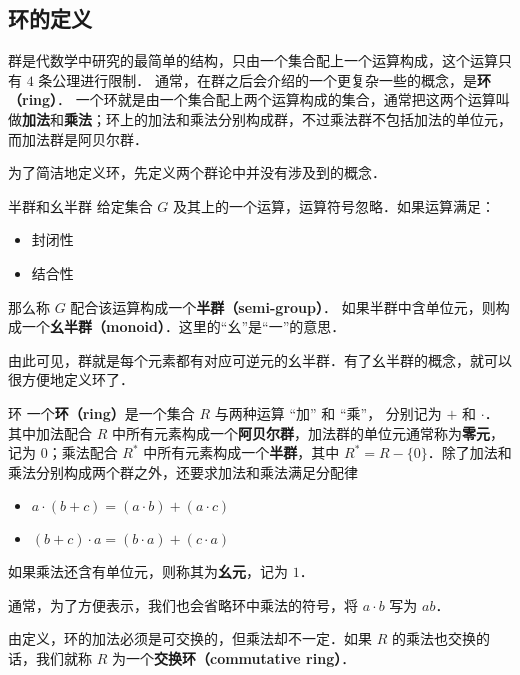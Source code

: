 


\subsection{环的定义}
群是代数学中研究的最简单的结构，只由一个集合配上一个运算构成，这个运算只有 $4$ 条公理进行限制． 通常，在群之后会介绍的一个更复杂一些的概念，是\textbf{环（ring）}． 一个环就是由一个集合配上两个运算构成的集合，通常把这两个运算叫做\textbf{加法}和\textbf{乘法}；环上的加法和乘法分别构成群，不过乘法群不包括加法的单位元，而加法群是阿贝尔群．

为了简洁地定义环，先定义两个群论中并没有涉及到的概念．

\begin{definition}{半群和幺半群}
给定集合 $G$ 及其上的一个运算，运算符号忽略．如果运算满足：
\begin{itemize}
\item 封闭性
\item 结合性
\end{itemize}
那么称 $G$ 配合该运算构成一个\textbf{半群（semi-group）}．
如果半群中含单位元，则构成一个\textbf{幺半群（monoid）}．这里的“幺”是“一”的意思．
\end{definition}

由此可见，群就是每个元素都有对应可逆元的幺半群．有了幺半群的概念，就可以很方便地定义环了．

\begin{definition}{环}
一个\textbf{环（ring）}是一个集合 $R$ 与两种运算 “加” 和 “乘”， 分别记为 $+$ 和 $\cdot$． 其中加法配合 $R$ 中所有元素构成一个\textbf{阿贝尔群}，加法群的单位元通常称为\textbf{零元}，记为 $0$；乘法配合 $R^*$ 中所有元素构成一个\textbf{半群}，其中 $R^*=R-\{0\}$．除了加法和乘法分别构成两个群之外，还要求加法和乘法满足分配律
\begin{itemize}
\item $a \cdot (b + c) = (a \cdot b) + (a \cdot c)$
\item $(b + c) \cdot a = (b \cdot a) + (c \cdot a)$
\end{itemize}
如果乘法还含有单位元，则称其为\textbf{幺元}，记为 $1$．
\end{definition}

通常，为了方便表示，我们也会省略环中乘法的符号，将 $a\cdot b$ 写为 $ab$．

由定义，环的加法必须是可交换的，但乘法却不一定．如果 $R$ 的乘法也交换的话，我们就称 $R$ 为一个\textbf{交换环（commutative ring）}．

